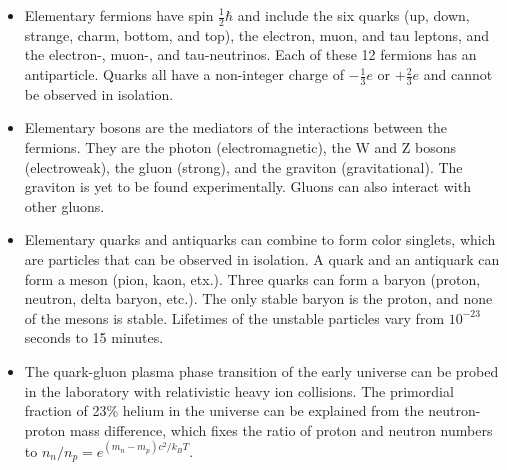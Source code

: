 \begin{itemize}
	\item Elementary fermions have spin $\frac{1}{2}\hbar$ and include the six quarks (up, down, strange, charm, bottom, and top), the electron, muon, and tau leptons, and the electron-, muon-, and tau-neutrinos. Each of these 12 fermions has an antiparticle. Quarks all have a non-integer charge of $-\frac{1}{3}e$ or $+\frac{2}{3}e$ and cannot be observed in isolation.
	\item Elementary bosons are the mediators of the interactions between the fermions. They are the photon (electromagnetic), the W and Z bosons (electroweak), the gluon (strong), and the graviton (gravitational). The graviton is yet to be found experimentally. Gluons can also interact with other gluons. 
	\item Elementary quarks and antiquarks can combine to form color singlets, which are particles that can be observed in isolation. A quark and an antiquark can form a meson (pion, kaon, etx.). Three quarks can form a baryon (proton, neutron, delta baryon, etc.). The only stable baryon is the proton, and none of the mesons is stable. Lifetimes of the unstable particles vary from $10^{-23}$ seconds to 15 minutes.
	\item The quark-gluon plasma phase transition of the early universe can be probed in the laboratory with relativistic heavy ion collisions. The primordial fraction of 23\% helium in the universe can be explained from the neutron-proton mass difference, which fixes the ratio of proton and neutron numbers to $n_n/n_p = e^{(m_n-m_p)c^2/k_BT}$.
\end{itemize}
